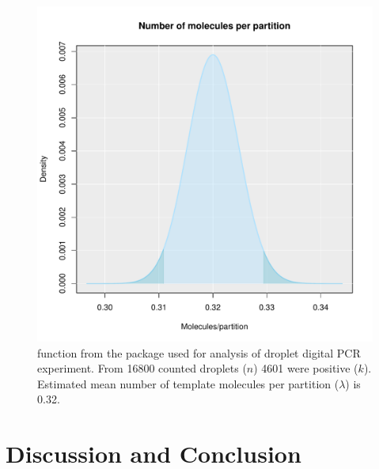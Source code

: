 \begin{figure}[htbp]
  \centering
  \includegraphics[clip=true, width=14cm]{figures/dpcR.pdf}
  \caption{ function from the  package used 
for analysis of droplet digital PCR experiment. From 16800 counted droplets 
($n$) 4601 were positive ($k$). Estimated mean number of template molecules per 
partition ($\lambda$) is 0.32.
}
  \label{figure:dpcR}
\end{figure}

\section{Discussion and Conclusion}

